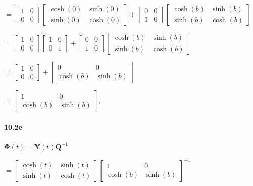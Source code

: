\documentclass[a4paper, 11pt]{article}
\begin{document}
	$=\left[\begin{array}{cc}
	1 & 0\\
	0 & 0
	\end{array}\right]\left[\begin{array}{cc}
	\cosh(0) & \sinh(0)\\
	\sinh(0) & \cosh(0)
	\end{array}\right]+\left[\begin{array}{cc}
	0 & 0\\
	1 & 0
	\end{array}\right]\left[\begin{array}{cc}
	\cosh(b) & \sinh(b)\\
	\sinh(b) & \cosh(b)
	\end{array}\right]$
	
	$=\left[\begin{array}{cc}
	1 & 0\\
	0 & 0
	\end{array}\right]\left[\begin{array}{cc}
	1 & 0\\
	0 & 1
	\end{array}\right]+\left[\begin{array}{cc}
	0 & 0\\
	1 & 0
	\end{array}\right]\left[\begin{array}{cc}
	\cosh(b) & \sinh(b)\\
	\sinh(b) & \cosh(b)
	\end{array}\right]$
	
	$=\left[\begin{array}{cc}
	1 & 0\\
	0 & 0
	\end{array}\right]+\left[\begin{array}{cc}
	0 & 0\\
	\cosh(b) & \sinh(b)
	\end{array}\right]$
	
	$=\left[\begin{array}{cc}
	1 & 0\\
	\cosh(b) & \sinh(b)
	\end{array}\right]$.
	
	
	\paragraph{10.2e}
	
	$\mathbf{\mathbf{\Phi}}(t)=\mathbf{Y}(t)\mathbf{Q}^{-1}$
	
	$=\left[\begin{array}{cc}
	\cosh(t) & \sinh(t)\\
	\sinh(t) & \cosh(t)
	\end{array}\right]\left[\begin{array}{cc}
	1 & 0\\
	\cosh(b) & \sinh(b)
	\end{array}\right]^{-1}$
	
\end{document}
